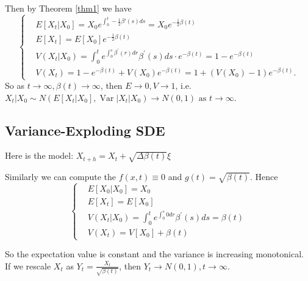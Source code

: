 \documentclass{ctexart}
\begin{document}
Then by Theorem \ref{thm1} we have
\begin{equation}
    \left\{\begin{aligned}
    &E\left[X_{t} | X_{0}\right]=X_{0} e^{\int_{0}^{t}-\frac{1}{2} \beta'(s) d s}=X_{0} e^{-\frac{1}{2} \beta(t)} \\
    &E\left[X_{t}\right]=E\left[X_{0}\right] e^{-\frac{1}{2} \beta(t)} \\
    &V\left(X_{t} | X_{0}\right)=\int_{0}^{t} e^{\int_{0}^{s} \beta^{\prime}(r) d r} \beta^{\prime}(s) d s \cdot e^{-\beta(t)}=1-e^{-\beta(t)} \\
    &V\left(X_{t}\right)=1-e^{-\beta(t)}+V\left(X_{0}\right) e^{-\beta(t)}=1+\left(V\left(X_{0}\right)-1\right) e^{-\beta(t)} .
    \end{aligned}\right.
\end{equation}
So as  $t \rightarrow \infty,\beta(t) \rightarrow \infty$, then  $E \rightarrow 0, V \rightarrow 1$, i.e. 
$X_{t} | X_{0} \sim N\left(E\left[X_{t} | X_{0}\right], \operatorname{Var}\left|X_{t}\right| X_{0}\right)\rightarrow N(0,1) \text{ as } t \rightarrow \infty$.
 
\subsection{Variance-Exploding SDE}
Here is the model: 
$X_{t+h}=X_{t}+\sqrt{\Delta \beta(t)} \xi$

Similarly we can compute the $f(x, t)\equiv 0$ and $g(t)=\sqrt{\beta(t)}$.
Hence  
\begin{equation}\left\{
    \begin{aligned}
        &E\left[X_{0} | X_{0}\right]=X_{0}\\
        &E\left[X_{t}\right]=E\left[X_{0}\right] \\ 
        &V\left(X_{t} | X_{0}\right)=\int_{0}^{t} e^{\int_{0}^{s} 0 d r} \beta^{\prime}(s) d s=\beta(t)\\ 
        &V\left(X_{t}\right)=V\left[X_{0}\right]+\beta(t)
    \end{aligned}\right.
\end{equation}

So the expectation value is constant and the variance is increasing monotonical. \\
If we rescale  $X_{t}$ as $Y_{t}=\frac{X_{t}}{\sqrt{\beta(t)}}$, then $Y_t \rightarrow N(0,1), t \rightarrow \infty$.
\end{document}

